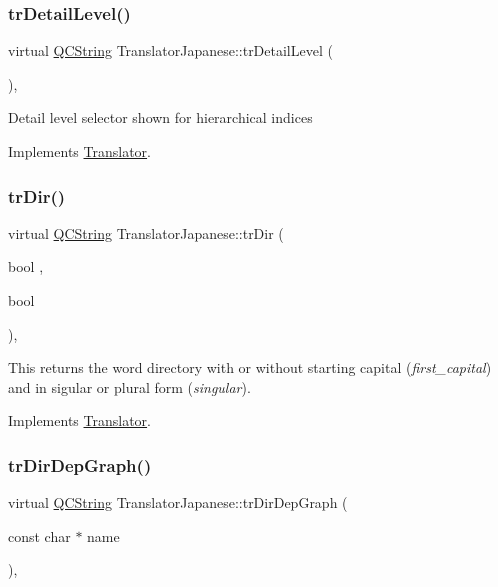 \subsubsection{\texorpdfstring{trDetailLevel()}{trDetailLevel()}}
{\footnotesize\ttfamily virtual \mbox{\hyperlink{class_q_c_string}{Q\+C\+String}} Translator\+Japanese\+::tr\+Detail\+Level (\begin{DoxyParamCaption}{ }\end{DoxyParamCaption})\hspace{0.3cm}{\ttfamily [inline]}, {\ttfamily [virtual]}}

Detail level selector shown for hierarchical indices 

Implements \mbox{\hyperlink{class_translator}{Translator}}.

\mbox{\label{class_translator_japanese_a08f91c6cd462e77469139a47f04777c7}} 
\subsubsection{\texorpdfstring{trDir()}{trDir()}}
{\footnotesize\ttfamily virtual \mbox{\hyperlink{class_q_c_string}{Q\+C\+String}} Translator\+Japanese\+::tr\+Dir (\begin{DoxyParamCaption}\item[{bool}]{,  }\item[{bool}]{ }\end{DoxyParamCaption})\hspace{0.3cm}{\ttfamily [inline]}, {\ttfamily [virtual]}}

This returns the word directory with or without starting capital ({\itshape first\+\_\+capital}) and in sigular or plural form ({\itshape singular}). 

Implements \mbox{\hyperlink{class_translator}{Translator}}.

\mbox{\label{class_translator_japanese_a00e1b37754ca0a80039aa712b4ba1118}} 
\subsubsection{\texorpdfstring{trDirDepGraph()}{trDirDepGraph()}}
{\footnotesize\ttfamily virtual \mbox{\hyperlink{class_q_c_string}{Q\+C\+String}} Translator\+Japanese\+::tr\+Dir\+Dep\+Graph (\begin{DoxyParamCaption}\item[{const char $\ast$}]{name }\end{DoxyParamCaption})\hspace{0.3cm}{\ttfamily [inline]}, {\ttfamily [virtual]}}

